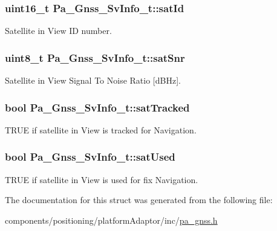 \subsubsection[{\texorpdfstring{sat\+Id}{satId}}]{\setlength{\rightskip}{0pt plus 5cm}uint16\+\_\+t Pa\+\_\+\+Gnss\+\_\+\+Sv\+Info\+\_\+t\+::sat\+Id}\hypertarget{struct_pa___gnss___sv_info__t_ac337f3f1263f515bdc8f3abeaa155475}{}\label{struct_pa___gnss___sv_info__t_ac337f3f1263f515bdc8f3abeaa155475}


Satellite in View ID number. 

\subsubsection[{\texorpdfstring{sat\+Snr}{satSnr}}]{\setlength{\rightskip}{0pt plus 5cm}uint8\+\_\+t Pa\+\_\+\+Gnss\+\_\+\+Sv\+Info\+\_\+t\+::sat\+Snr}\hypertarget{struct_pa___gnss___sv_info__t_a50c5f81a8a9beccf5481f670773ff40c}{}\label{struct_pa___gnss___sv_info__t_a50c5f81a8a9beccf5481f670773ff40c}


Satellite in View Signal To Noise Ratio \mbox{[}d\+B\+Hz\mbox{]}. 

\subsubsection[{\texorpdfstring{sat\+Tracked}{satTracked}}]{\setlength{\rightskip}{0pt plus 5cm}bool Pa\+\_\+\+Gnss\+\_\+\+Sv\+Info\+\_\+t\+::sat\+Tracked}\hypertarget{struct_pa___gnss___sv_info__t_aa2e4449c451f5748c4138415e965fbd6}{}\label{struct_pa___gnss___sv_info__t_aa2e4449c451f5748c4138415e965fbd6}


T\+R\+UE if satellite in View is tracked for Navigation. 

\subsubsection[{\texorpdfstring{sat\+Used}{satUsed}}]{\setlength{\rightskip}{0pt plus 5cm}bool Pa\+\_\+\+Gnss\+\_\+\+Sv\+Info\+\_\+t\+::sat\+Used}\hypertarget{struct_pa___gnss___sv_info__t_a3ee7b02010364f4ceaabf4d9985d338e}{}\label{struct_pa___gnss___sv_info__t_a3ee7b02010364f4ceaabf4d9985d338e}


T\+R\+UE if satellite in View is used for fix Navigation. 



The documentation for this struct was generated from the following file\+:\begin{DoxyCompactItemize}
\item 
components/positioning/platform\+Adaptor/inc/\hyperlink{pa__gnss_8h}{pa\+\_\+gnss.\+h}\end{DoxyCompactItemize}
